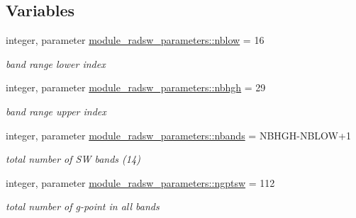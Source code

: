 \subsection*{Variables}
\textbf{ }\par
\begin{DoxyCompactItemize}
\item 
\mbox{\label{namespacemodule__radsw__parameters_a2c5efc91f02dc0d4bdbd5e490f44c19c}} 
integer, parameter \hyperlink{namespacemodule__radsw__parameters_a2c5efc91f02dc0d4bdbd5e490f44c19c}{module\+\_\+radsw\+\_\+parameters\+::nblow} = 16
\begin{DoxyCompactList}\small\item\em band range lower index \end{DoxyCompactList}\item 
\mbox{\label{namespacemodule__radsw__parameters_a39e5ca4fd5defbc2545ee39bbf50d61b}} 
integer, parameter \hyperlink{namespacemodule__radsw__parameters_a39e5ca4fd5defbc2545ee39bbf50d61b}{module\+\_\+radsw\+\_\+parameters\+::nbhgh} = 29
\begin{DoxyCompactList}\small\item\em band range upper index \end{DoxyCompactList}\item 
\mbox{\label{namespacemodule__radsw__parameters_a8f97b7698e8e5e2aec6e463fd09255cc}} 
integer, parameter \hyperlink{namespacemodule__radsw__parameters_a8f97b7698e8e5e2aec6e463fd09255cc}{module\+\_\+radsw\+\_\+parameters\+::nbands} = N\+B\+H\+GH-\/N\+B\+L\+OW+1
\begin{DoxyCompactList}\small\item\em total number of SW bands (14) \end{DoxyCompactList}\item 
\mbox{\label{namespacemodule__radsw__parameters_adc3e4d5a848d50e2883e05c62f61bc97}} 
integer, parameter \hyperlink{namespacemodule__radsw__parameters_adc3e4d5a848d50e2883e05c62f61bc97}{module\+\_\+radsw\+\_\+parameters\+::ngptsw} = 112
\begin{DoxyCompactList}\small\item\em total number of g-\/point in all bands \end{DoxyCompactList}\item 

\end{DoxyCompactItemize}
